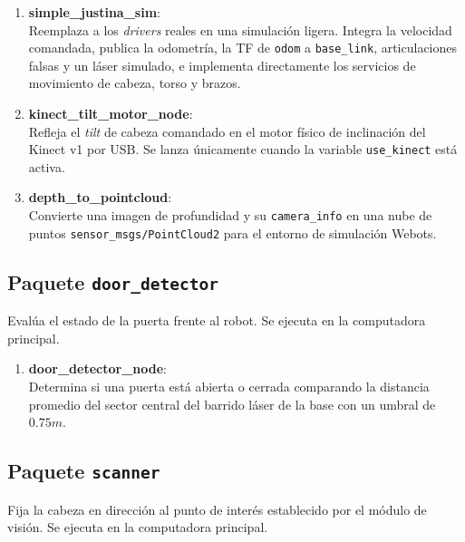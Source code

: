 \begin{enumerate}

\item \textbf{simple\_justina\_sim}: \\
Reemplaza a los \textit{drivers} reales en una simulación ligera. Integra la velocidad comandada, publica la odometría, la TF de \texttt{odom} a \texttt{base\_link}, articulaciones falsas y un láser simulado, e implementa directamente los servicios de movimiento de cabeza, torso y brazos.

\item \textbf{kinect\_tilt\_motor\_node}: \\
Refleja el \textit{tilt} de cabeza comandado en el motor físico de inclinación del Kinect v1 por USB. Se lanza únicamente cuando la variable \texttt{use\_kinect} está activa.

\item \textbf{depth\_to\_pointcloud}: \\
Convierte una imagen de profundidad y su \texttt{camera\_info} en una nube de puntos \texttt{sensor\_msgs/PointCloud2} para el entorno de simulación Webots.

\end{enumerate}

\subsection{Paquete \texttt{door\_detector}}

Evalúa el estado de la puerta frente al robot. Se ejecuta en la computadora principal.

\begin{enumerate}

\item \textbf{door\_detector\_node}: \\
Determina si una puerta está abierta o cerrada comparando la distancia promedio del sector central del barrido láser de la base con un umbral de $0.75m$.

\end{enumerate}

\subsection{Paquete \texttt{scanner}}

Fija la cabeza en dirección al punto de interés establecido por el módulo de visión. Se ejecuta en la computadora principal.

